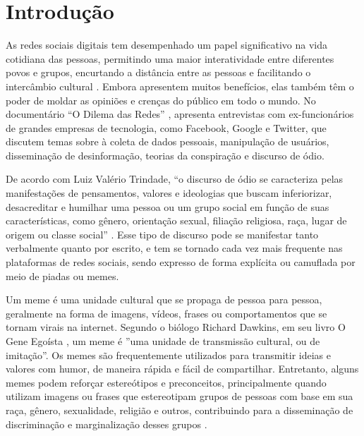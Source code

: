 \chapter{Introdução}
\label{cap:01}

As redes sociais digitais tem desempenhado um papel significativo na vida cotidiana das pessoas, permitindo uma maior interatividade entre diferentes povos e grupos, encurtando a distância entre as pessoas e facilitando o intercâmbio cultural \cite{Nascimento2017}. Embora apresentem muitos benefícios, elas também têm o poder de moldar as opiniões e crenças do público em todo o mundo. No documentário “O Dilema das Redes” \cite{SocialDilemma2020}, apresenta entrevistas com ex-funcionários de grandes empresas de tecnologia, como Facebook, Google e Twitter, que discutem temas sobre à coleta de dados pessoais, manipulação de usuários, disseminação de desinformação, teorias da conspiração e discurso de ódio.


De acordo com Luiz Valério Trindade, ``o discurso de ódio se caracteriza pelas manifestações de pensamentos, valores e ideologias que buscam inferiorizar, desacreditar e humilhar uma pessoa ou um grupo social em função de suas características, como gênero, orientação sexual, filiação religiosa, raça, lugar de origem ou classe social'' \cite{Trindade2022}. Esse tipo de discurso pode se manifestar tanto verbalmente quanto por escrito, e tem se tornado cada vez mais frequente nas plataformas de redes sociais, sendo expresso de forma explícita ou camuflada por meio de piadas ou memes.


Um meme é uma unidade cultural que se propaga de pessoa para pessoa, geralmente na forma de imagens, vídeos, frases ou comportamentos que se tornam virais na internet. Segundo o biólogo Richard Dawkins, em seu livro O Gene Egoísta \cite{Dawkins1976}, um meme é ''uma unidade de transmissão cultural, ou de imitação''. Os memes são frequentemente utilizados para transmitir ideias e valores com humor, de maneira rápida e fácil de compartilhar. Entretanto, alguns memes podem reforçar estereótipos e preconceitos, principalmente quando utilizam imagens ou frases que estereotipam grupos de pessoas com base em sua raça, gênero, sexualidade, religião e outros, contribuindo para a disseminação de discriminação e marginalização desses grupos \cite{Burke2004}.


